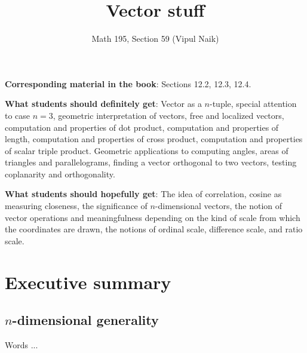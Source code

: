 \documentclass[10pt]{amsart}
\title{Vector stuff}
\author{Math 195, Section 59 (Vipul Naik)}
\begin{document}
\maketitle

{\bf Corresponding material in the book}: Sections 12.2, 12.3, 12.4.

{\bf What students should definitely get}: Vector as a $n$-tuple,
special attention to case $n = 3$, geometric interpretation of
vectors, free and localized vectors, computation and properties of dot
product, computation and properties of length, computation and
properties of cross product, computation and properties of scalar
triple product. Geometric applications to computing angles, areas of
triangles and parallelograms, finding a vector orthogonal to two
vectors, testing coplanarity and orthogonality.

{\bf What students should hopefully get}: The idea of correlation,
cosine as measuring closeness, the significance of $n$-dimensional
vectors, the notion of vector operations and meaningfulness depending
on the kind of scale from which the coordinates are drawn, the notions
of ordinal scale, difference scale, and ratio scale.

\section*{Executive summary}

\subsection{$n$-dimensional generality}

Words ...
\end{document}
